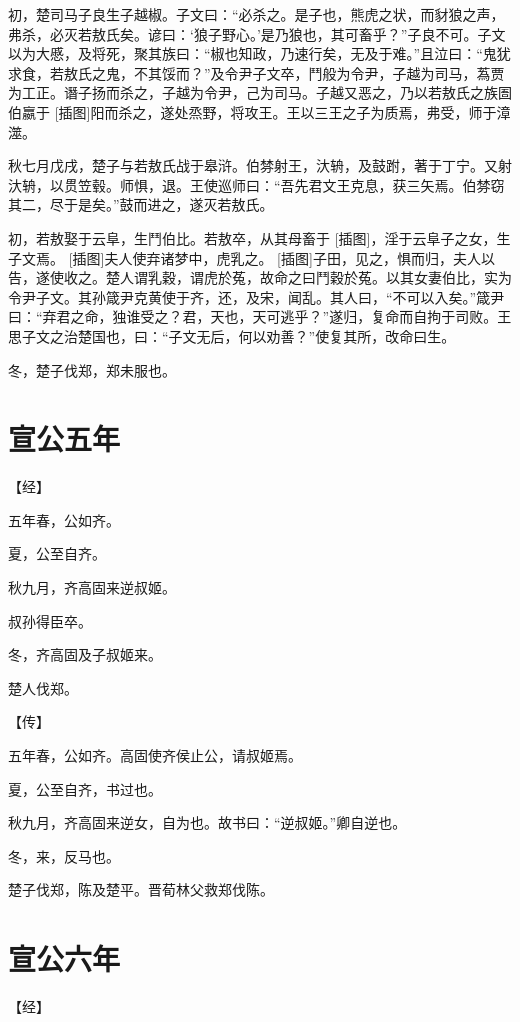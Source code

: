 \documentclass[a4paper,12pt,UTF8,twoside]{ctexbook}
\begin{document}
初，楚司马子良生子越椒。子文曰：“必杀之。是子也，熊虎之状，而豺狼之声，弗杀，必灭若敖氏矣。谚曰：‘狼子野心。’是乃狼也，其可畜乎？”子良不可。子文以为大慼，及将死，聚其族曰：“椒也知政，乃速行矣，无及于难。”且泣曰：“鬼犹求食，若敖氏之鬼，不其馁而？”及令尹子文卒，鬥般为令尹，子越为司马，蒍贾为工正。谮子扬而杀之，子越为令尹，己为司马。子越又恶之，乃以若敖氏之族圄伯嬴于 [插图]阳而杀之，遂处烝野，将攻王。王以三王之子为质焉，弗受，师于漳澨。

秋七月戊戌，楚子与若敖氏战于皋浒。伯棼射王，汏辀，及鼓跗，著于丁宁。又射汏辀，以贯笠毂。师惧，退。王使巡师曰：“吾先君文王克息，获三矢焉。伯棼窃其二，尽于是矣。”鼓而进之，遂灭若敖氏。

初，若敖娶于云阜，生鬥伯比。若敖卒，从其母畜于 [插图]，淫于云阜子之女，生子文焉。 [插图]夫人使弃诸梦中，虎乳之。 [插图]子田，见之，惧而归，夫人以告，遂使收之。楚人谓乳穀，谓虎於菟，故命之曰鬥穀於菟。以其女妻伯比，实为令尹子文。其孙箴尹克黄使于齐，还，及宋，闻乱。其人曰，“不可以入矣。”箴尹曰：“弃君之命，独谁受之？君，天也，天可逃乎？”遂归，复命而自拘于司败。王思子文之治楚国也，曰：“子文无后，何以劝善？”使复其所，改命曰生。

冬，楚子伐郑，郑未服也。

\section{宣公五年}


【经】

五年春，公如齐。

夏，公至自齐。

秋九月，齐高固来逆叔姬。

叔孙得臣卒。

冬，齐高固及子叔姬来。

楚人伐郑。

【传】

五年春，公如齐。高固使齐侯止公，请叔姬焉。

夏，公至自齐，书过也。

秋九月，齐高固来逆女，自为也。故书曰：“逆叔姬。”卿自逆也。

冬，来，反马也。

楚子伐郑，陈及楚平。晋荀林父救郑伐陈。


\section{宣公六年}




【经】
\end{document}
